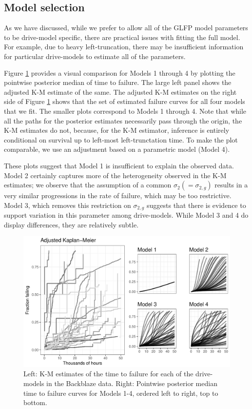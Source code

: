 \documentclass[aap]{imsart}
\begin{document}
\subsection{Model selection}
\label{sec:Model Comparisons}
As we have discussed, while we prefer to allow all of the GLFP model parameters to be drive-model specific, there are practical issues with fitting the full model. For example, due to heavy left-truncation, there may be insufficient information for particular drive-models to estimate all of the parameters. 

Figure \ref{fig:fig2} provides a visual comparison for Models 1 through 4 by plotting the pointwise posterior median of time to failure. The large left panel shows the adjusted K-M estimate of the same. The adjusted K-M estimates on the right side of Figure \ref{fig:fig2} shows that the set of estimated failure curves for all four models that we fit. The smaller plots correspond to Models 1 through 4.  Note that while all the paths for the posterior estimates necessarily pass through the origin, the K-M estimates do not, because, for the K-M estimator, inference is entirely conditional on survival up to left-most left-trunctation time. To make the plot comparable, we use an adjustment based on a parametric model (Model 4).

These plots suggest that Model 1 is insufficient to explain the observed data. Model 2 certainly captures more of the heterogeneity observed in the K-M estimates; we observe that the assumption of a common $\sigma_2(=\sigma_{2,g})$ results in a very similar progressions in the rate of failure, which may be too restrictive. Model 3, which removes this restriction on $\sigma_{2,g}$ suggests that there is evidence to support variation in this parameter among drive-models. While Model 3 and 4 do display differences, they are relatively subtle.

\begin{figure}[H]
\includegraphics[width=\textwidth]{heterogeneity-compare}
\caption{Left: K-M estimates of the time to failure for each of the drive-models in the Backblaze data. Right: Pointwise posterior median time to failure curves for Models 1-4, ordered left to right, top to bottom.}
\label{fig:fig2}
\end{figure}
\end{document}

